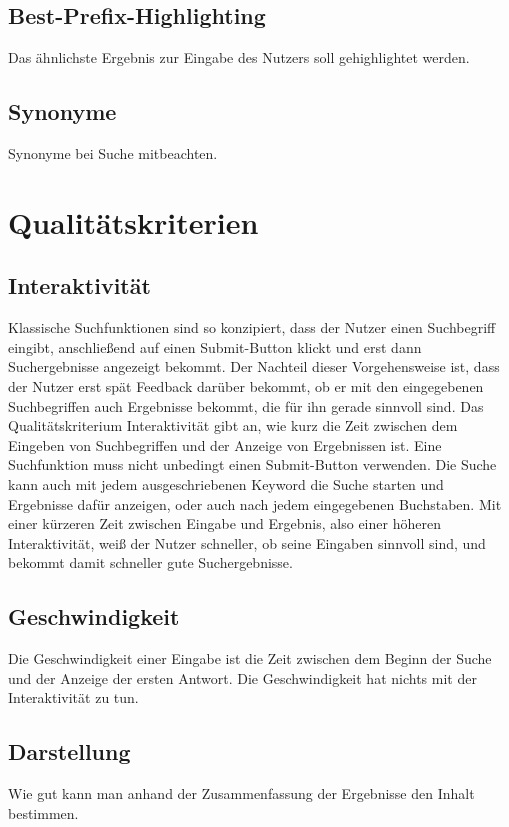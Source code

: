 \subsection*{Best-Prefix-Highlighting}
Das ähnlichste Ergebnis zur Eingabe des Nutzers soll gehighlightet werden.

\subsection*{Synonyme}
Synonyme bei Suche mitbeachten.

\section{Qualitätskriterien}

\subsection*{Interaktivität}
Klassische Suchfunktionen sind so konzipiert, dass der Nutzer einen Suchbegriff eingibt, anschließend auf einen Submit-Button klickt und erst dann Suchergebnisse angezeigt bekommt.
Der Nachteil dieser Vorgehensweise ist, dass der Nutzer erst spät Feedback darüber bekommt, ob er mit den eingegebenen Suchbegriffen auch Ergebnisse bekommt, die für ihn gerade sinnvoll sind.
Das Qualitätskriterium Interaktivität gibt an, wie kurz die Zeit zwischen dem Eingeben von Suchbegriffen und der Anzeige von Ergebnissen ist.
Eine Suchfunktion muss nicht unbedingt einen Submit-Button verwenden.
Die Suche kann auch mit jedem ausgeschriebenen Keyword die Suche starten und Ergebnisse dafür anzeigen, oder auch nach jedem eingegebenen Buchstaben.
Mit einer kürzeren Zeit zwischen Eingabe und Ergebnis, also einer höheren Interaktivität, weiß der Nutzer schneller, ob seine Eingaben sinnvoll sind, und bekommt damit schneller gute Suchergebnisse.

\subsection*{Geschwindigkeit}
Die Geschwindigkeit einer Eingabe ist die Zeit zwischen dem Beginn der Suche und der Anzeige der ersten Antwort.
Die Geschwindigkeit hat nichts mit der Interaktivität zu tun.


\subsection*{Darstellung}
Wie gut kann man anhand der Zusammenfassung der Ergebnisse den Inhalt bestimmen.

